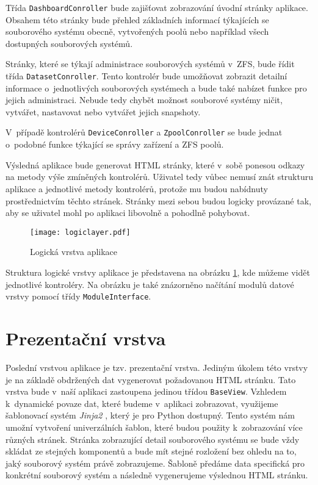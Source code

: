     Třída \verb|DashboardConroller| bude zajišťovat zobrazování úvodní stránky aplikace. Obsahem této stránky bude přehled základních informací týkajících se souborového systému obecně, vytvořených poolů nebo například všech dostupných souborových systémů.

    Stránky, které se týkají administrace souborových systémů v~ZFS, bude řídit třída \verb|DatasetConroller|. Tento kontrolér bude umožňovat zobrazit detailní informace o~jednotlivých souborových systémech a bude také nabízet funkce pro jejich administraci. Nebude tedy chybět možnost souborové systémy ničit, vytvářet, nastavovat nebo vytvářet jejich snapshoty.

    V~případě kontrolérů \verb|DeviceConroller| a \verb|ZpoolConroller| se bude jednat o~podobné funkce týkající se správy zařízení a ZFS poolů.

    Výsledná aplikace bude generovat HTML stránky, které v~sobě ponesou odkazy na metody výše zmíněných kontrolérů. Uživatel tedy vůbec nemusí znát strukturu aplikace a jednotlivé metody kontrolérů, protože mu budou nabídnuty prostřednictvím těchto stránek. Stránky mezi sebou budou logicky provázané tak, aby se uživatel mohl po aplikaci libovolně a pohodlně pohybovat.

    \begin{figure}
        \centering
        \texttt{[image: logiclayer.pdf]}
        \caption{Logická vrstva aplikace}
        \label{logiclayer}
    \end{figure}

    Struktura logické vrstvy aplikace je představena na obrázku \ref{logiclayer}, kde můžeme vidět jednotlivé kontroléry. Na obrázku je také znázorněno načítání modulů datové vrstvy pomocí třídy \verb|ModuleInterface|.

\section{Prezentační vrstva}
Poslední vrstvou aplikace je tzv. prezentační vrstva. Jediným úkolem této vrstvy je na základě obdržených dat vygenerovat požadovanou HTML stránku. Tato vrstva bude v~naší aplikaci zastoupena jedinou třídou \verb|BaseView|. Vzhledem k~dynamické povaze dat, které budeme v~aplikaci zobrazovat, využijeme šablonovací systém \emph{Jinja2} \cite{jinja2}, který je pro Python dostupný. Tento systém nám umožní vytvoření univerzálních šablon, které budou použity k~zobrazování více různých stránek. Stránka zobrazující detail souborového systému se bude vždy skládat ze stejných komponentů a bude mít stejné rozložení bez ohledu na to, jaký souborový systém právě zobrazujeme. Šabloně předáme data specifická pro konkrétní souborový systém a následně vygenerujeme výslednou HTML stránku.
